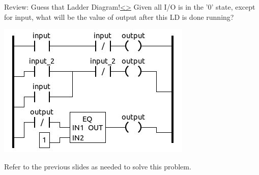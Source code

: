 \documentclass[12pt]{extarticle}
\newenvironment{instructionblock}{\Large\bgroup}{\egroup}
\newcounter{next}
\newcounter{prev}
\begin{document}
\pagebreak
{}
\begin{slide}{Review: Guess that Ladder Diagram!}{\hyperref[slide \theprev]{\textless}\hyperref[slide \thenext]{\textgreater}}
\begin{instructionblock}
	Given all I/O is in the '0' state, except for input, what will be the value of output after this LD is done running?
	\begin{center}
		\includegraphics[scale=1]{Images/LadderDiagram04.JPG}
	\end{center}
\end{instructionblock}
\end{slide}
\vfill
\noindent
Refer to the previous slides as needed to solve this problem.
	
\end{document}
